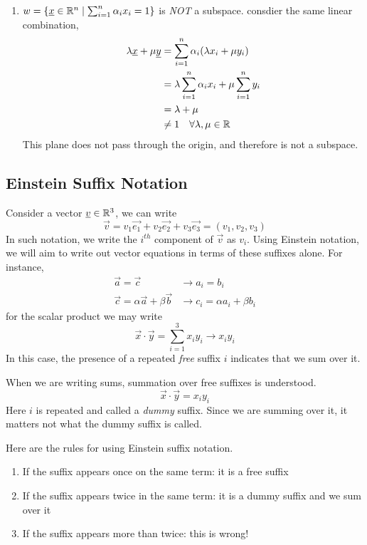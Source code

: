 \documentclass{article}
\numberwithin{equation}{section}
\begin{document}
\begin{eg}
\begin{enumerate}
    \item $w = \{ \underline{x} \in \mathbb{R}^n \mid \sum_{i=1}^{n}{\alpha_ix_i} = 1\}$ is \emph{NOT} a subspace.
    consdier the same linear combination,
    \begin{align*}
        \lambda \underline{x} + \mu \underline{y} &= \sum_{i=1}^{n}{\alpha_i(\lambda x_i + \mu y_i)} \\
        &= \lambda\sum_{i=1}^{n}{\alpha_ix_i} + \mu\sum_{i=1}^{n}{y_i} \\
        &= \lambda + \mu \\
        &\neq 1 \quad \forall \lambda, \mu \in \mathbb{R}
    \end{align*}
    This plane does not pass through the origin, and therefore is not a subspace.
    \end{enumerate}
\end{eg}

\subsection{Einstein Suffix Notation}

Consider a vector $\underline{v} \in \mathbb{R}^3$, we can write
\[
    \vec{v} = v_1\vec{e_1} + v_2\vec{e_2} + v_3\vec{e_3} = (v_1, v_2, v_3)
\]
In such notation, we write the $i^{th}$ component of $\vec{v}$ as $v_i$. Using Einstein notation, we will aim to write out vector equations in terms of these suffixes alone. For instance,
\begin{align*}
    \vec{a} = \vec{c} &\longrightarrow a_i = b_i \\
    \vec{c} = \alpha \vec{a} + \beta \vec{b} &\longrightarrow c_i = \alpha a_i + \beta b_i
\end{align*}
for the scalar product we may write
\[
    \vec{x} \cdot \vec{y} = \sum_{i=1}^{3}{x_iy_i} \longrightarrow x_iy_i
\]
In this case, the presence of a repeated \emph{free} suffix $i$ indicates that we sum over it.

\begin{defi}
    When we are writing sums, summation over free suffixes is understood.
    \[
        \vec{x} \cdot \vec{y} = x_iy_i
    \]
    Here $i$ is repeated and called a \emph{dummy} suffix. Since we are summing over it, it matters not what the dummy suffix is called.
\end{defi}

Here are the rules for using Einstein suffix notation.
\begin{enumerate}
    \item If the suffix appears once on the same term: it is a free suffix
    \item If the suffix appears twice in the same term: it is a dummy suffix and we sum over it
    \item If the suffix appears more than twice: this is wrong!
\end{enumerate}
\end{document}

